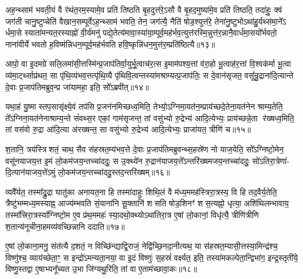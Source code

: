 अह॒न्थ्साम॑ भवती॒यं वै र॑थंत॒रम॒स्यामे॒व प्रति॑ तिष्ठति बृ॒हदुत्त॑रे॒\-ऽसौ वै बृ॒हद॒मुष्या॑मे॒व प्रति॑ तिष्ठति॒ तदा॑हुः॒ क्व॑ जग॑ती चानु॒ष्टुप्चेति॑ वैखान॒सम्पूर्वे\-ऽह॒न्थ्साम॑ भवति॒ तेन॒ जग॑त्यै॒ नैति॑ षोड॒श्युत्त॑रे॒ तेना॑नु॒ष्टुभो\-ऽथा॑हु॒र्यथ्स॑मा॒ने᳚\-ऽ र्धमा॒से स्याता॑मन्यत॒रस्याह्नो॑ वी॒र्य॑मनु॑ पद्ये॒तेत्य॑मावा॒स्या॑या॒म्पूर्व॒मह॑र्भव॒त्युत्त॑रस्मि॒न्नुत्त॑र॒न्नानै॒वार्ध॑मा॒सयो᳚र्भवतो॒ नाना॑वीर्ये भवतो ह॒विष्म॑न्निधन॒म्पूर्व॒मह॑र्भवति हवि॒ष्कृन्नि॑धन॒मुत्त॑र॒म्प्रति॑ष्ठित्यै॥१३॥

{\anuvakamend[{उत्त॑रेण रथन्त॒रम्पूर्वे\-ऽन्वेक॑विशतिश्च॥४॥}]}

आपो॒ वा इ॒दमग्रे॑ सलि॒लमा॑सी॒त्तस्मि॑न्प्र॒जाप॑तिर्वा॒युर्भू॒त्वाच॑र॒त्स इ॒माम॑पश्य॒त्तां व॑रा॒हो भू॒त्वाह॑र॒त्तां वि॒श्वक॑र्मा भू॒त्वा व्य॑मा॒र्ट्थ्साप्र॑थत॒ सा पृ॑थि॒व्य॑भव॒त्तत्पृ॑थि॒व्यै पृ॑थिवि॒त्वन्तस्या॑मश्राम्यत्प्र॒जाप॑तिः॒ स दे॒वान॑सृजत॒ वसू᳚न्रु॒द्राना॑दि॒त्यान्ते दे॒वाः प्र॒जाप॑तिमब्रुव॒न्प्र जा॑यामहा॒ इति॒ सो᳚\-ऽब्रवीत्॥१४॥

यथा॒हं यु॒ष्मास्तप॒सासृ॑क्ष्ये॒वं तप॑सि प्र॒जन॑नमिच्छध्व॒मिति॒ तेभ्यो॒\-ऽग्निमा॒यत॑न॒म्प्राय॑च्छदे॒तेना॒यत॑नेन श्राम्य॒तेति॒ ते᳚\-ऽग्निना॒यत॑नेनाश्राम्य॒न्ते सं॑वथ्स॒र एकां॒ गाम॑सृजन्त॒ तां वसु॑भ्यो रु॒द्रेभ्य॑ आदि॒त्येभ्यः॒ प्राय॑च्छन्ने॒ता र॑ख्षध्व॒मिति॒ तां वस॑वो रु॒द्रा आ॑दि॒त्या अ॑रख्षन्त॒ सा वसु॑भ्यो रु॒द्रेभ्य॑ आदि॒त्येभ्यः॒ प्राजा॑यत॒ त्रीणि॑ च॥१५॥

श॒तानि॒ त्रय॑स्त्रिशतं॒ चाथ॒ सैव स॑हस्रत॒म्य॑भव॒त्ते दे॒वाः प्र॒जाप॑तिमब्रुवन्थ्स॒हस्रे॑ण नो याज॒येति॒ सो᳚\-ऽग्निष्टो॒मेन॒ वसू॑नयाजय॒त्त इ॒मं लो॒कम॑जय॒न्तच्चा॑ददुः॒ स उ॒क्थ्ये॑न रु॒द्रान॑याजय॒त्ते᳚\-ऽन्तरि॑ख्षमजय॒न्तच्चा॑ददुः॒ सो॑\-ऽतिरा॒त्रेणा॑- दि॒त्यान॑याजय॒त्ते॑\-ऽमुं लो॒कम॑जय॒न्तच्चा॑ददु॒स्तद॒न्तरि॑ख्षम्॥१६॥

व्यवै᳚र्यत॒ तस्मा᳚द्रु॒द्रा घातु॑का अनायत॒ना हि तस्मा॑दाहुः शिथि॒लं वै म॑ध्य॒ममह॑स्त्रिरा॒त्रस्य॒ वि हि तद॒वैर्य॒तेति॒ त्रैष्टु॑भम्मध्य॒मस्याह्न॒ आज्य॑म्भवति सं॒याना॑नि सू॒क्तानि॑ शसति षोड॒शिनꣳ॑ शस॒त्यह्नो॒ धृत्या॒ अशि॑थिलम्भावाय॒ तस्मा᳚त्त्रिरा॒त्रस्या᳚ग्निष्टो॒म ए॒व प्र॑थ॒ममहः॑ स्या॒दथो॒क्थ्यो\-ऽथा॑तिरा॒त्र ए॒षां लो॒कानां॒ विधृ॑त्यै॒ त्रीणि॑त्रीणि श॒तान्य॑नूचीना॒हमव्य॑वच्छिन्नानि ददाति॥१७॥

ए॒षां लो॒काना॒मनु॒ संत॑त्यै द॒शतं॒ न विच्छि॑न्द्याद्वि॒राजं॒ नेद्वि॑च्छि॒नदा॒नीत्यथ॒ या स॑हस्रत॒म्यासी॒त्तस्या॒मिन्द्र॑श्च॒ विष्णु॑श्च॒ व्याय॑च्छेता॒ꣳ॒ स इन्द्रो॑\-ऽमन्यता॒नया॒ वा इ॒दं विष्णुः॑ स॒हस्रं॑ वर्क्ष्यत॒ इति॒ तस्या॑मकल्पेता॒न्द्विभा॑ग॒ इन्द्र॒स्तृती॑ये॒ विष्णु॒स्तद्वा ए॒षाभ्यनू᳚च्यत उ॒भा जि॑ग्यथु॒रिति॒ तां वा ए॒ताम॑च्छावा॒कः॥१८॥

